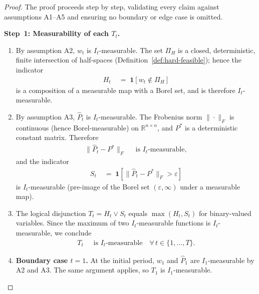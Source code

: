 \documentclass[12pt,openany]{book}
\newcommand{\bfw}{\mathbf{w}}
\numberwithin{equation}{chapter}
\theoremstyle{plain}
\theoremstyle{definition}
\theoremstyle{remark}
\def\mathcal#1{#1}%
\def\bfw{w}%
\begin{document}
\begin{proof}
The proof proceeds step by step, validating every claim against
assumptions A1--A5 and ensuring no boundary or edge case is
omitted.

\medskip
\noindent\textbf{Step~1: Measurability of each $T_t$.}
\begin{enumerate}
  \item By assumption A2, $\bfw_t$ is $\mathcal{I}_t$-measurable.  The
        set $\Pi_H$ is a closed, deterministic, finite intersection
        of half-spaces (Definition~\ref{def:hard-feasible}); hence
        the indicator
        \begin{align}
          H_t
          &\;=\; \mathbf{1}[\bfw_t \notin \Pi_H]
          \label{eq:Ht-meas}
        \end{align}
        is a composition of a measurable map with a Borel set, and
        is therefore $\mathcal{I}_t$-measurable.

  \item By assumption A3, $\hat{P}_t$ is $\mathcal{I}_t$-measurable.
        The Frobenius norm $\|\cdot\|_F$ is continuous (hence
        Borel-measurable) on $\mathbb{R}^{n \times n}$, and
        $P^*$ is a deterministic constant matrix.  Therefore
        \begin{align}
          \|\hat{P}_t - P^*\|_F
          &\;\text{ is } \mathcal{I}_t\text{-measurable},
          \label{eq:norm-meas}
        \end{align}
        and the indicator
        \begin{align}
          S_t
          &\;=\; \mathbf{1}[\|\hat{P}_t - P^*\|_F > \varepsilon]
          \label{eq:St-meas}
        \end{align}
        is $\mathcal{I}_t$-measurable (pre-image of the Borel set
        $(\varepsilon, \infty)$ under a measurable map).

  \item The logical disjunction $T_t = H_t \vee S_t$ equals
        $\max(H_t, S_t)$ for binary-valued variables.  Since the
        maximum of two $\mathcal{I}_t$-measurable functions is
        $\mathcal{I}_t$-measurable, we conclude
        \begin{align}
          T_t
          &\;\text{ is } \mathcal{I}_t\text{-measurable}
          \quad \forall\, t \in \{1,\ldots,T\}.
          \label{eq:Tt-meas}
        \end{align}

  \item \textbf{Boundary case $t = 1$.}  At the initial period,
        $\bfw_1$ and $\hat{P}_1$ are $\mathcal{I}_1$-measurable by A2
        and A3.  The same argument applies, so $T_1$ is
        $\mathcal{I}_1$-measurable.


\end{enumerate}
\end{proof}
\end{document}
